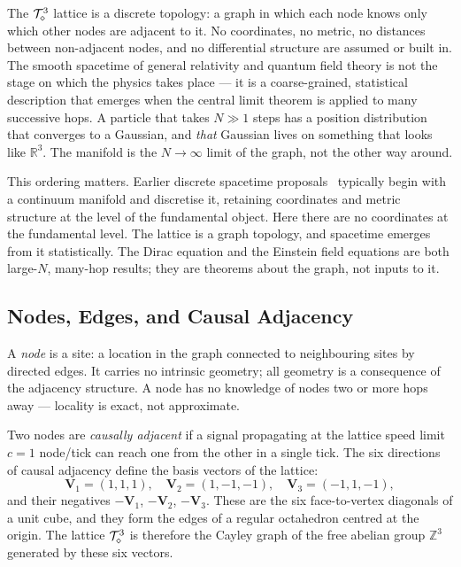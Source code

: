 
\label{sec:substrate}

The $\mathcal{T}_\diamond^3$ lattice is a discrete topology: a graph in which each node
knows only which other nodes are adjacent to it.
No coordinates, no metric, no distances between non-adjacent nodes, and no
differential structure are assumed or built in.
The smooth spacetime of general relativity and quantum field theory is not
the stage on which the physics takes place --- it is a coarse-grained,
statistical description that emerges when the central limit theorem is
applied to many successive hops.
A particle that takes $N \gg 1$ steps has a position distribution that
converges to a Gaussian, and \emph{that} Gaussian lives on something that
looks like $\mathbb{R}^3$.
The manifold is the $N\to\infty$ limit of the graph, not the other way around.

This ordering matters.
Earlier discrete spacetime proposals~\cite{bombelli1987, thooft2016,
wolfram2002} typically begin with a continuum manifold and discretise it,
retaining coordinates and metric structure at the level of the fundamental
object.
Here there are no coordinates at the fundamental level.
The lattice is a graph topology, and spacetime emerges from it statistically.
The Dirac equation and the Einstein field equations are both large-$N$,
many-hop results; they are theorems about the graph, not inputs to it.

\subsection{Nodes, Edges, and Causal Adjacency}
\label{subsec:nodes}

A \emph{node} is a site: a location in the graph connected to neighbouring
sites by directed edges.
It carries no intrinsic geometry; all geometry is a consequence of the
adjacency structure.
A node has no knowledge of nodes two or more hops away --- locality is
exact, not approximate.

Two nodes are \emph{causally adjacent} if a signal propagating at the lattice
speed limit $c = 1$ node/tick can reach one from the other in a single tick.
The six directions of causal adjacency define the basis vectors of the lattice:
\begin{equation}
    \mathbf{V}_1 = (1,1,1),\quad
    \mathbf{V}_2 = (1,-1,-1),\quad
    \mathbf{V}_3 = (-1,1,-1),
    \label{eq:rgb_vectors}
\end{equation}
and their negatives $-\mathbf{V}_1$, $-\mathbf{V}_2$, $-\mathbf{V}_3$.
These are the six face-to-vertex diagonals of a unit cube, and they form
the edges of a regular octahedron centred at the origin.
The lattice $\mathcal{T}_\diamond^3$ is therefore the Cayley graph of the free abelian
group $\mathbb{Z}^3$ generated by these six vectors.

